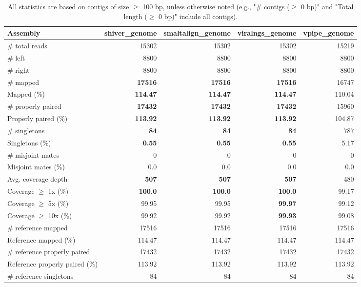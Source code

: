 \documentclass[12pt,a4paper]{article}
\begin{document}
\begin{table}[ht]
\begin{center}
\caption{All statistics are based on contigs of size $\geq$ 100 bp, unless otherwise noted (e.g., "\# contigs ($\geq$ 0 bp)" and "Total length ($\geq$ 0 bp)" include all contigs).}
\begin{tabular}{|l*{4}{|r}|}
\hline
Assembly & shiver\_genome & smaltalign\_genome & viralngs\_genome & vpipe\_genome \\ \hline
\# total reads & 15302 & 15302 & 15302 & 15219 \\ \hline
\# left & 8800 & 8800 & 8800 & 8800 \\ \hline
\# right & 8800 & 8800 & 8800 & 8800 \\ \hline
\# mapped & {\bf 17516} & {\bf 17516} & {\bf 17516} & 16747 \\ \hline
Mapped (\%) & {\bf 114.47} & {\bf 114.47} & {\bf 114.47} & 110.04 \\ \hline
\# properly paired & {\bf 17432} & {\bf 17432} & {\bf 17432} & 15960 \\ \hline
Properly paired (\%) & {\bf 113.92} & {\bf 113.92} & {\bf 113.92} & 104.87 \\ \hline
\# singletons & {\bf 84} & {\bf 84} & {\bf 84} & 787 \\ \hline
Singletons (\%) & {\bf 0.55} & {\bf 0.55} & {\bf 0.55} & 5.17 \\ \hline
\# misjoint mates & 0 & 0 & 0 & 0 \\ \hline
Misjoint mates (\%) & 0.0 & 0.0 & 0.0 & 0.0 \\ \hline
Avg. coverage depth & {\bf 507} & {\bf 507} & {\bf 507} & 480 \\ \hline
Coverage $\geq$ 1x (\%) & {\bf 100.0} & {\bf 100.0} & {\bf 100.0} & 99.17 \\ \hline
Coverage $\geq$ 5x (\%) & 99.95 & 99.95 & {\bf 99.97} & 99.12 \\ \hline
Coverage $\geq$ 10x (\%) & 99.92 & 99.92 & {\bf 99.93} & 99.08 \\ \hline
\# reference mapped & 17516 & 17516 & 17516 & 17516 \\ \hline
Reference mapped (\%) & 114.47 & 114.47 & 114.47 & 114.47 \\ \hline
\# reference properly paired & 17432 & 17432 & 17432 & 17432 \\ \hline
Reference properly paired (\%) & 113.92 & 113.92 & 113.92 & 113.92 \\ \hline
\# reference singletons & 84 & 84 & 84 & 84 \\ \hline

\end{tabular}
\end{center}
\end{table}
\end{document}
